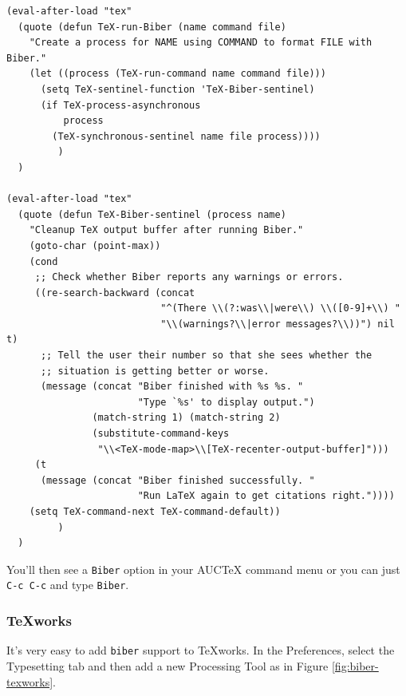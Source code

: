 \documentclass{ltxdockit}
\begin{document}
\small
\begin{verbatim}
(eval-after-load "tex"
  (quote (defun TeX-run-Biber (name command file)
    "Create a process for NAME using COMMAND to format FILE with Biber." 
    (let ((process (TeX-run-command name command file)))
      (setq TeX-sentinel-function 'TeX-Biber-sentinel)
      (if TeX-process-asynchronous
          process
        (TeX-synchronous-sentinel name file process))))
         )
  )

(eval-after-load "tex"
  (quote (defun TeX-Biber-sentinel (process name)
    "Cleanup TeX output buffer after running Biber."
    (goto-char (point-max))
    (cond
     ;; Check whether Biber reports any warnings or errors.
     ((re-search-backward (concat
                           "^(There \\(?:was\\|were\\) \\([0-9]+\\) "
                           "\\(warnings?\\|error messages?\\))") nil t)
      ;; Tell the user their number so that she sees whether the
      ;; situation is getting better or worse.
      (message (concat "Biber finished with %s %s. "
                       "Type `%s' to display output.")
               (match-string 1) (match-string 2)
               (substitute-command-keys
                "\\<TeX-mode-map>\\[TeX-recenter-output-buffer]")))
     (t
      (message (concat "Biber finished successfully. "
                       "Run LaTeX again to get citations right."))))
    (setq TeX-command-next TeX-command-default))
         )
  )
\end{verbatim}
\normalsize

\noindent You'll then see a \verb+Biber+ option in your AUCTeX command menu or
you can just \verb+C-c C-c+ and type \verb+Biber+.

\subsubsection{TeXworks}

It's very easy to add \verb+biber+ support to TeXworks. In the Preferences,
select the Typesetting tab and then add a new Processing Tool as in Figure
\ref{fig:biber-texworks}.
\end{document}
